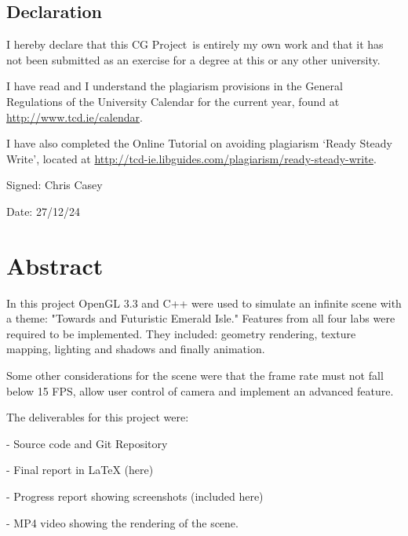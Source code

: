 \documentclass[a4paper,oneside,12pt]{book}
\title{\thesistitle}
\author{\authorname}
\newcommand{\typeofthesis}{CG Project} %
\begin{document}

\doublespacing

\section*{Declaration}
I hereby declare that this \typeofthesis\ is entirely my own work and that it has not been submitted as an exercise for a degree at this or any other university.

I have read and I understand the plagiarism provisions in the General Regulations of the University Calendar for the current year, found at \url{http://www.tcd.ie/calendar}.

I have also completed the Online Tutorial on avoiding plagiarism `Ready Steady Write', located at \url{http://tcd-ie.libguides.com/plagiarism/ready-steady-write}.
\vspace{1cm}

Signed:     Chris Casey

Date:       27/12/24


\newpage
\chapter{Abstract}

In this project OpenGL 3.3 and C++ were used to simulate an infinite scene with a theme: "Towards and Futuristic Emerald Isle." Features from all four labs were required to be implemented. They included: geometry rendering, texture mapping, lighting and shadows and finally animation. 


Some other considerations for the scene were that the frame rate must not fall below 15 FPS, allow user control of camera and implement an advanced feature.


The deliverables for this project were: 

    - Source code and Git Repository

    - Final report in LaTeX (here)

    - Progress report showing screenshots (included here)

    - MP4 video showing the rendering of the scene.

\newpage
\raggedright %


\newpage




\mainmatter

%
%


%
%
%
%
\newpage
\end{document}
